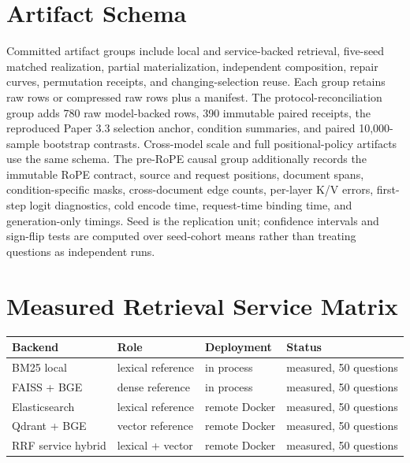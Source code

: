 \documentclass[11pt]{article}
\begin{document}
\section{Artifact Schema}
Committed artifact groups include local and service-backed retrieval,
five-seed matched realization, partial materialization, independent
composition, repair curves, permutation receipts, and changing-selection
reuse. Each group retains raw rows or compressed raw rows plus a manifest.
The protocol-reconciliation group adds 780 raw model-backed rows, 390 immutable
paired receipts, the reproduced Paper 3.3 selection anchor, condition summaries,
and paired 10,000-sample bootstrap contrasts.
Cross-model scale and full positional-policy artifacts use the same schema.
The pre-RoPE causal group additionally records the immutable RoPE contract,
source and request positions, document spans, condition-specific masks,
cross-document edge counts, per-layer K/V errors, first-step logit diagnostics,
cold encode time, request-time binding time, and generation-only timings. Seed
is the replication unit; confidence intervals and sign-flip tests are computed
over seed-cohort means rather than treating questions as independent runs.

\section{Measured Retrieval Service Matrix}
\begin{table}[h]
\centering
\begin{tabular}{llll}
\toprule
Backend & Role & Deployment & Status \\
\midrule
BM25 local & lexical reference & in process & measured, 50 questions \\
FAISS + BGE & dense reference & in process & measured, 50 questions \\
Elasticsearch & lexical reference & remote Docker & measured, 50 questions \\
Qdrant + BGE & vector reference & remote Docker & measured, 50 questions \\
RRF service hybrid & lexical + vector & remote Docker & measured, 50 questions \\
\bottomrule
\end{tabular}
\end{table}
\end{document}
